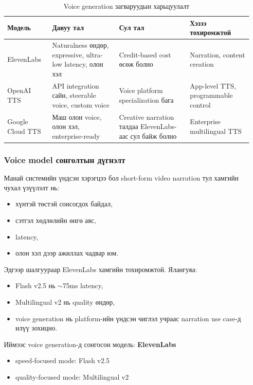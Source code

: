 \begin{table}[H]
\centering
\small
\begin{tabular}{|p{2.5cm}|p{3.5cm}|p{3.5cm}|p{3cm}|}
\hline
\textbf{Модель} & \textbf{Давуу тал} & \textbf{Сул тал} & \textbf{Хэзээ тохиромжтой} \\
\hline
ElevenLabs & Naturalness өндөр, expressive, ultra-low latency, олон хэл & Credit-based cost өсөж болно & Narration, content creation \\
\hline
OpenAI TTS & API integration сайн, steerable voice, custom voice & Voice platform specialization бага & App-level TTS, programmable control \\
\hline
Google Cloud TTS & Маш олон voice, олон хэл, enterprise-ready & Creative narration талдаа ElevenLabs-аас сул байж болно & Enterprise multilingual TTS \\
\hline
\end{tabular}
\caption{Voice generation загваруудын харьцуулалт}
\end{table}

\subsubsection{Voice model сонголтын дүгнэлт}

Манай системийн үндсэн хэрэгцээ бол short-form video narration тул хамгийн чухал үзүүлэлт нь:

\begin{itemize}
\item хүнтэй төстэй сонсогдох байдал,
\item сэтгэл хөдлөлийн өнгө аяс,
\item latency,
\item олон хэл дээр ажиллах чадвар юм.
\end{itemize}

Эдгээр шалгуураар ElevenLabs хамгийн тохиромжтой. Ялангуяа:

\begin{itemize}
\item Flash v2.5 нь $\sim$75ms latency,
\item Multilingual v2 нь quality өндөр,
\item voice generation нь platform-ийн үндсэн чиглэл учраас narration use case-д илүү зохицно.
\end{itemize}

Иймээс voice generation-д сонгосон модель: \textbf{ElevenLabs}

\begin{itemize}
\item speed-focused mode: Flash v2.5
\item quality-focused mode: Multilingual v2
\end{itemize}

